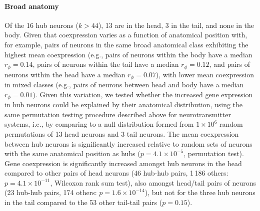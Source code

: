 \documentclass[10pt,letterpaper]{article}
\begin{document}
\paragraph{Broad anatomy}
Of the 16 hub neurons ($k > 44$), 13 are in the head, 3 in the tail, and none in the body.
Given that coexpression varies as a function of anatomical position with, for example, pairs of neurons in the same broad anatomical class exhibiting the highest mean coexpression (e.g., pairs of neurons within the body have a median $r_\phi = 0.14$, pairs of neurons within the tail have a median $r_\phi = 0.12$, and pairs of neurons within the head have a median $r_\phi = 0.07$), with lower mean coexpression in mixed classes (e.g., pairs of neurons between head and body have a median $r_\phi = 0.01$).
Given this variation, we tested whether the increased gene expression in hub neurons could be explained by their anatomical distribution, using the same permutation testing procedure described above for neurotransmitter systems, i.e., by comparing to a null distribution formed from $1\times 10^6$ random permutations of 13 head neurons and 3 tail neurons.
The mean coexpression between hub neurons is significantly increased relative to random sets of neurons with the same anatomical position as hubs ($p = 4.1\times 10^{-5}$, permutation test).
Gene coexpression is significantly increased amongst hub neurons in the head compared to other pairs of head neurons (46 hub-hub pairs, 1\,186 others: $p = 4.1 \times 10^{-11}$, Wilcoxon rank sum test), also amongst head/tail pairs of neurons (23 hub-hub pairs, 174 others: $p = 1.6 \times 10^{-14}$), but not for the three hub neurons in the tail compared to the 53 other tail-tail pairs ($p = 0.15$).
\end{document}
